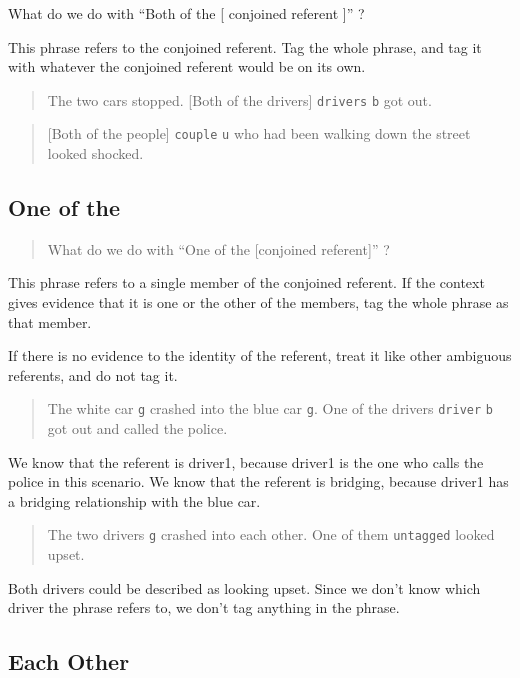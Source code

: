 \documentclass[
]{book}
\begin{document}
What do we do with ``Both of the {[} conjoined referent {]}'' ?

This phrase refers to the conjoined referent. Tag the whole phrase, and tag it with whatever the conjoined referent would be on its own.

\begin{quote}
The two cars stopped.
{[}Both of the drivers{]} \texttt{drivers} \texttt{b} got out.
\end{quote}

\begin{quote}
{[}Both of the people{]} \texttt{couple} \texttt{u} who had been walking down the street looked shocked.
\end{quote}

\hypertarget{one-of-the}{%
\subsection{One of the}\label{one-of-the}}

\begin{quote}
What do we do with ``One of the {[}conjoined referent{]}'' ?
\end{quote}

This phrase refers to a single member of the conjoined referent.
If the context gives evidence that it is one or the other of the members, tag the whole phrase as that member.

If there is no evidence to the identity of the referent, treat it like other ambiguous referents, and do not tag it.

\begin{quote}
The white car \texttt{g} crashed into the blue car \texttt{g}.
One of the drivers \texttt{driver} \texttt{b} got out and called the police.
\end{quote}

We know that the referent is driver1, because driver1 is the one who calls the police in this scenario.
We know that the referent is bridging, because driver1 has a bridging relationship with the blue car.

\begin{quote}
The two drivers \texttt{g} crashed into each other.
One of them \texttt{untagged} looked upset.
\end{quote}

Both drivers could be described as looking upset.
Since we don't know which driver the phrase refers to, we don't tag anything in the phrase.

\hypertarget{each-other}{%
\subsection{Each Other}\label{each-other}}
\end{document}
